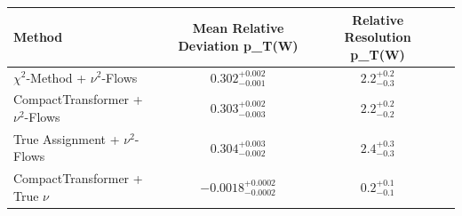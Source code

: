     \begin{tabular}{lccc}
        \toprule
        Method & Mean Relative Deviation p_{T}(W) & Relative Resolution p_{T}(W) \\
        \midrule
        $\chi^2$-Method + $\nu^2$-Flows & $0.302_{-0.001}^{+0.002}$ & $2.2_{-0.3}^{+0.2}$ \\
        CompactTransformer + $\nu^2$-Flows & $0.303_{-0.003}^{+0.002}$ & $2.2_{-0.2}^{+0.2}$ \\
        True Assignment + $\nu^2$-Flows & $0.304_{-0.002}^{+0.003}$ & $2.4_{-0.3}^{+0.3}$ \\
        CompactTransformer + True $\nu$ & $-0.0018_{-0.0002}^{+0.0002}$ & $0.2_{-0.1}^{+0.1}$ \\
        \bottomrule
    \end{tabular}